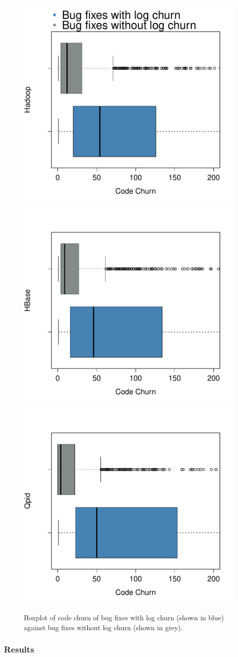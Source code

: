  \begin{figure}[t]
 	\centering
 	\caption{Boxplot of code churn of bug fixes with log churn (shown in blue) against bug fixes without log churn (shown in grey).}
 	\label{fig:figure3}
 	
 	\includegraphics[width=.49\textwidth]{HadoopBoxPlot}
 	\hfill
 	\includegraphics[width=.49\textwidth]{HBaseBoxPlot}\hfill
 	\includegraphics[width=.49\textwidth]{QpidBoxPlot}
 	
 \end{figure}


\subsubsection*{\textbf{Results}}

